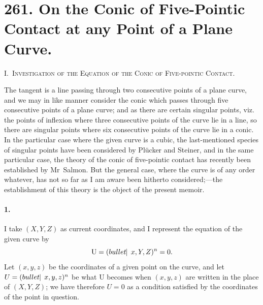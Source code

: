\documentclass[12pt,a4paper]{article}
\theoremstyle{plain}
\begin{document}
\newpage
\section*{261. On the Conic of Five-Pointic Contact at any Point of a Plane Curve.}
\label{sec:paper261}


\medskip

\noindent\textsc{I.~Investigation of the Equation of the Conic of Five-pointic Contact.}

\medskip

The  tangent  is  a  line  passing  through  two  consecutive  points  of  a  plane  curve,
and  we  may  in  like  manner  consider  the  conic  which  passes  through  five  consecutive
points  of  a  plane  curve;  and  as  there  are  certain  singular  points,  viz.  the  points  of
inflexion  where  three  consecutive  points  of  the  curve  lie  in  a  line,  so  there  are
singular  points  where  six  consecutive  points  of  the  curve  lie  in  a  conic.  In  the
particular  case  where  the  given  curve  is  a  cubic,  the  last-mentioned  species  of  singular
points  have  been  considered  by  Pl\"ucker  and  Steiner,  and  in  the  same  particular  case,
the  theory  of  the  conic  of  five-pointic  contact  has  recently  been  established  by  Mr~Salmon.
But  the  general  case,  where  the  curve  is  of  any  order  whatever,  has  not  so  far  as
I  am  aware  been  hitherto  considered;---the  establishment  of  this  theory  is  the  object
of  the  present  memoir.

\paragraph{1.}
I  take  $(X, Y, Z)$  as  current  coordinates,  and  I  represent  the  equation  of  the
given  curve  by
\[
\mathrm{U} = (\\bullet\!\!\mid\, x, Y, Z)^n = 0.
\]
Let  $(x, y, z)$  be  the  coordinates  of  a  given  point  on  the  curve,  and  let  $U = (\\bullet\!\!\mid\, x, y, z)^n$
be  what  $\mathrm{U}$  becomes  when  $(x, y, z)$  are  written  in  the  place  of  $(X, Y, Z)$;  we  have
therefore  $U = 0$  as  a  condition  satisfied  by  the  coordinates  of  the  point  in  question.
\end{document}
